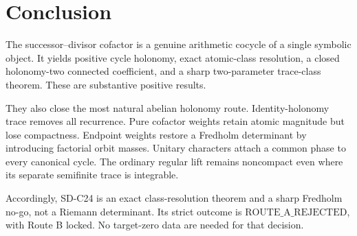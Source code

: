 \section{Conclusion}
\label{sec:conclusion}

The successor--divisor cofactor is a genuine arithmetic cocycle of a single
symbolic object.  It yields positive cycle holonomy, exact atomic-class
resolution, a closed holonomy-two connected coefficient, and a sharp
two-parameter trace-class theorem.  These are substantive positive results.

They also close the most natural abelian holonomy route.  Identity-holonomy
trace removes all recurrence.  Pure cofactor weights retain atomic magnitude
but lose compactness.  Endpoint weights restore a Fredholm determinant by
introducing factorial orbit masses.  Unitary characters attach a common
phase to every canonical cycle.  The ordinary regular lift remains
noncompact even where its separate semifinite trace is integrable.

Accordingly, SD-C24 is an exact class-resolution theorem and a sharp
Fredholm no-go, not a Riemann determinant.  Its strict outcome is
\(\mathrm{ROUTE\_A\_REJECTED}\), with Route B locked.  No target-zero data are
needed for that decision.
